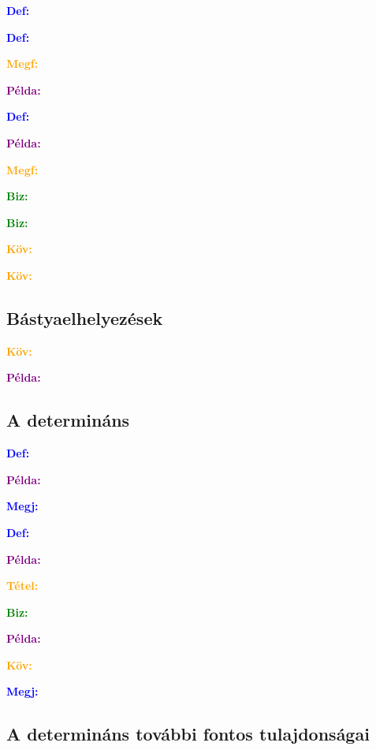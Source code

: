 \documentclass[../szamtud.tex]{subfiles}
\begin{document}
        \textcolor{blue}{\textbf{Def:}}

        \textcolor{blue}{\textbf{Def:}}

        \textcolor{orange}{\textbf{Megf:}}

        \textcolor{purple}{\textbf{Példa:}} 

        \textcolor{blue}{\textbf{Def:}}

        \textcolor{purple}{\textbf{Példa:}} 

        \textcolor{orange}{\textbf{Megf:}}

        \textcolor{green}{\textbf{Biz:}}

        \textcolor{green}{\textbf{Biz:}}

        \textcolor{orange}{\textbf{Köv:}}

        \textcolor{orange}{\textbf{Köv:}}

    \subsection{Bástyaelhelyezések}

        \textcolor{orange}{\textbf{Köv:}}

        \textcolor{purple}{\textbf{Példa:}} 

    \subsection{A determináns}

        \textcolor{blue}{\textbf{Def:}}

        \textcolor{purple}{\textbf{Példa:}} 

        \textcolor{blue}{\textbf{Megj:}}

        \textcolor{blue}{\textbf{Def:}}

        \textcolor{purple}{\textbf{Példa:}} 

        \textcolor{orange}{\textbf{Tétel:}}

        \textcolor{green}{\textbf{Biz:}}

        \textcolor{purple}{\textbf{Példa:}} 

        \textcolor{orange}{\textbf{Köv:}}

        \textcolor{blue}{\textbf{Megj:}}

    \subsection{A determináns további fontos tulajdonságai}
\end{document}
